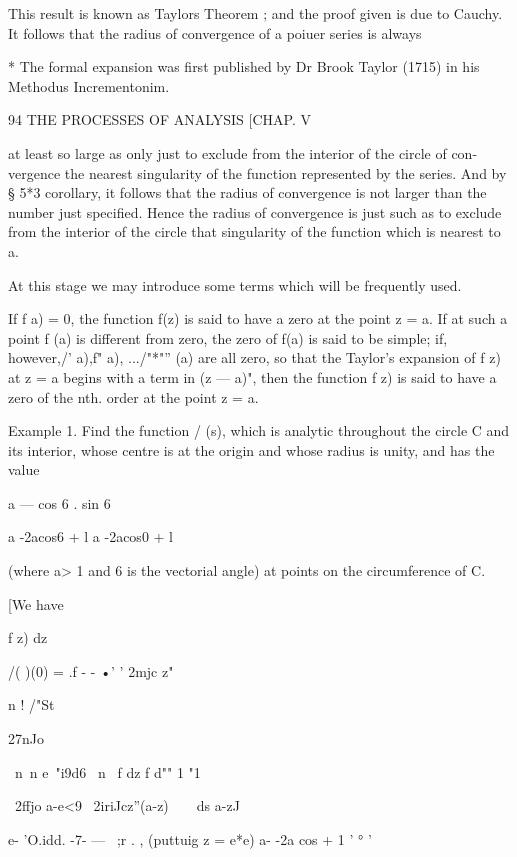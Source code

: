 {{This result is known as Taylors Theorem ; and the proof given is due
to Cauchy. It follows that the radius of convergence of a poiuer
series is always

* The formal expansion was first published by Dr Brook Taylor (1715)
in his Methodus Incrementonim.



94 THE PROCESSES OF ANALYSIS [CHAP. V

at least so large as only just to exclude from the interior of the
circle of con- vergence the nearest singularity of the function
represented by the series. And by § 5*3 corollary, it follows that the
radius of convergence is not larger than the number just specified.
Hence the radius of convergence is just such as to exclude from the
interior of the circle that singularity of the function which is
nearest to a.

At this stage we may introduce some terms which will be frequently
used.

If f a) = 0, the function f(z) is said to have a zero at the point z =
a. If at such a point f (a) is different from zero, the zero of f(a)
is said to be simple; if, however,/' a),f" a), .../"*"'' (a) are all
zero, so that the Taylor's expansion of f z) at z = a begins with a
term in (z — a)", then the function f z) is said to have a zero of the
nth. order at the point z = a.

Example 1. Find the function / (s), which is analytic throughout the
circle C and its interior, whose centre is at the origin and whose
radius is unity, and has the value

a — cos 6 . sin 6



a -2acos6 + l a -2acos0 + l

(where a> 1 and 6 is the vectorial angle) at points on the
circumference of C.

[We have

f z) dz



/( )(0) = .f - - •' ' 2mjc z"

n ! /"St

27nJo

\ n\ n e~"i9d6 \ n \ f dz f d"" 1 "1

~2ffjo a-e<9 ~2iriJcz''(a-z)~~\ \ ds a-zJ



e- 'O.idd. -7- — ~;r . , (puttuig z = e*e) a- -2a cos + 1 ' ° '



}}
